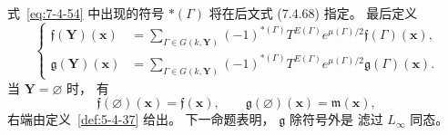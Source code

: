 式~\eqref{eq:7-4-54}
中出现的符号
$\ast(\Gamma)$
将在后文式 (7.4.68) 指定。
最后定义
\begin{equation}
\left\{
\begin{aligned}
\mathfrak f(\mathbf Y)(\mathbf x)
&=\sum_{\Gamma\in G(k,\mathbf Y)}
(-1)^{\ast(\Gamma)}
T^{E(\Gamma)}e^{\mu(\Gamma)/2}
\mathfrak f(\Gamma)(\mathbf x),\\
\mathfrak g(\mathbf Y)(\mathbf x)
&=\sum_{\Gamma\in G(k,\mathbf Y)}
(-1)^{\ast(\Gamma)}
T^{E(\Gamma)}e^{\mu(\Gamma)/2}
\mathfrak g(\Gamma)(\mathbf x).
\end{aligned}
\right.
\tag{7.4.54}\label{eq:7-4-54}
\end{equation}
当 $\mathbf Y=\varnothing$ 时，
有
\begin{equation}
\mathfrak f(\varnothing)(\mathbf x)
=\mathfrak f(\mathbf x),
\qquad
\mathfrak g(\varnothing)(\mathbf x)
=\mathfrak m(\mathbf x),
\tag{7.4.55}\label{eq:7-4-55}
\end{equation}
右端由定义~\ref{def:5-4-37} 给出。
下一命题表明，
$\mathfrak g$ 除符号外是
滤过 $L_\infty$ 同态。

